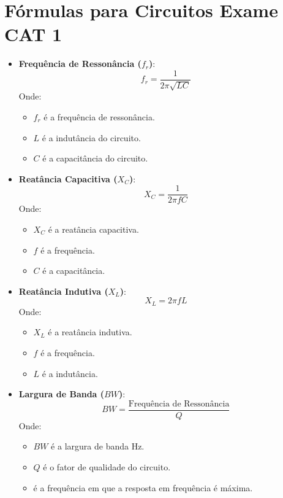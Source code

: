 \documentclass{article}
\begin{document}
\section*{Fórmulas para Circuitos Exame CAT 1}



\begin{itemize}
    \item \textbf{Frequência de Ressonância (\( f_r \))}:
    \[ f_r = \frac{1}{{2 \pi \sqrt{LC}}} \]
    Onde:
    \begin{itemize}
        \item \( f_r \) é a frequência de ressonância.
        \item \( L \) é a indutância do circuito.
        \item \( C \) é a capacitância do circuito.
    \end{itemize}
    
    \item \textbf{Reatância Capacitiva (\( X_C \))}:
    \[ X_C = \frac{1}{{2 \pi f C}} \]
    Onde:
    \begin{itemize}
        \item \( X_C \) é a reatância capacitiva.
        \item \( f \) é a frequência.
        \item \( C \) é a capacitância.
    \end{itemize}
    
    \item \textbf{Reatância Indutiva (\( X_L \))}:
    \[ X_L = 2 \pi f L \]
    Onde:
    \begin{itemize}
        \item \( X_L \) é a reatância indutiva.
        \item \( f \) é a frequência.
        \item \( L \) é a indutância.
    \end{itemize}
    
    \item \textbf{Largura de Banda (\( BW \))}:
    \[ BW = \frac{{\text{Frequência de Ressonância}}}{{Q}} \]
    Onde:
    \begin{itemize}
        \item \( BW \) é a largura de banda Hz.
        \item \( Q \) é o fator de qualidade do circuito.
        \item {} é a frequência em que a resposta em frequência é máxima.
    \end{itemize}

\end{itemize}
\end{document}
